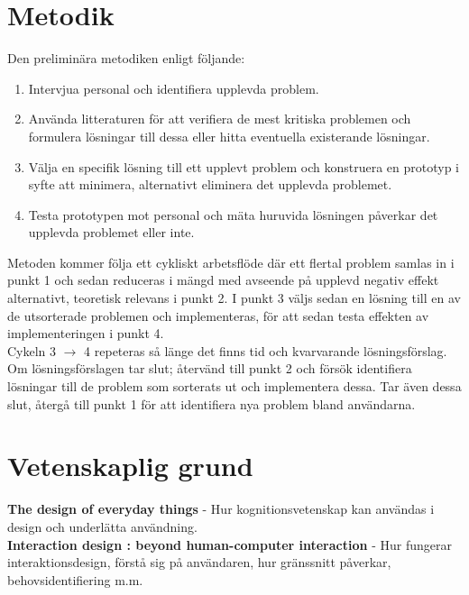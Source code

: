 \documentclass{article}
\begin{document}
\section*{Metodik}

  Den preliminära metodiken enligt följande:
  \begin{enumerate}
    \item{Intervjua personal och identifiera upplevda problem.}
    \item{Använda litteraturen för att verifiera de mest kritiska problemen och
        formulera lösningar till dessa eller hitta eventuella existerande
        lösningar.}
    \item{Välja en specifik lösning till ett upplevt problem och konstruera en
        prototyp i syfte att minimera, alternativt eliminera det upplevda
        problemet.}
    \item{Testa prototypen mot personal och mäta huruvida lösningen påverkar
        det upplevda problemet eller inte.}
  \end{enumerate}

  Metoden kommer följa ett cykliskt arbetsflöde där ett flertal problem samlas
  in i punkt 1 och sedan reduceras i mängd med avseende på upplevd negativ
  effekt alternativt, teoretisk relevans i punkt 2. I punkt 3 väljs sedan en
  lösning till en av de utsorterade problemen och implementeras, för att sedan
  testa effekten av implementeringen i punkt 4. \\

  Cykeln 3 $\rightarrow$ 4 repeteras så länge det finns tid och kvarvarande
  lösningsförslag. Om lösningsförslagen tar slut; återvänd till punkt 2 och
  försök identifiera lösningar till de problem som sorterats ut och
  implementera dessa. Tar även dessa slut, återgå till punkt 1 för att
  identifiera nya problem bland användarna.

\section*{Vetenskaplig grund}

  \textbf{The design of everyday things}\cite{c_design_norman} -
  Hur kognitionsvetenskap kan användas i design och underlätta användning. \\

  \textbf{Interaction design : beyond human-computer
    interaction}\cite{c_interaction_design} -
  Hur fungerar interaktionsdesign, förstå sig på användaren, hur gränssnitt
  påverkar, behovsidentifiering m.m.
\end{document}
